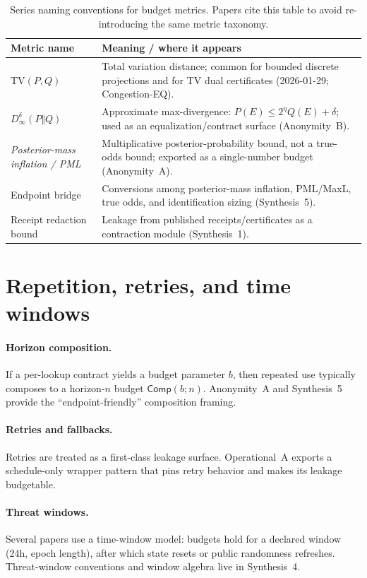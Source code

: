 \documentclass[11pt]{article}
\newcommand{\TV}{\mathrm{TV}}
\begin{document}
\begin{table}[t]
\centering
\begin{tabularx}{\linewidth}{@{}lX@{}}
\toprule
Metric name & Meaning / where it appears \\
\midrule
$\TV(P,Q)$ & Total variation distance; common for bounded discrete projections and for TV dual certificates (2026-01-29; Congestion-EQ).\\
$D_\infty^{\delta}(P\Vert Q)$ & Approximate max-divergence: $P(E)\le 2^{\eta}Q(E)+\delta$; used as an equalization/contract surface (Anonymity~B).\\
\emph{Posterior-mass inflation / PML} & Multiplicative posterior-probability bound, not a true-odds bound; exported as a single-number budget (Anonymity~A).\\
Endpoint bridge & Conversions among posterior-mass inflation, PML/MaxL, true odds, and identification sizing (Synthesis~5).\\
Receipt redaction bound & Leakage from published receipts/certificates as a contraction module (Synthesis~1).\\
\bottomrule
\end{tabularx}
\caption{Series naming conventions for budget metrics. Papers cite this table to avoid re-introducing the same metric taxonomy.}
\label{tab:metrics}
\end{table}

\section{Repetition, retries, and time windows}
\paragraph{Horizon composition.}
If a per-lookup contract yields a budget parameter $b$, then repeated use typically composes to a horizon-$n$ budget $\mathsf{Comp}(b;n)$.
Anonymity~A and Synthesis~5 provide the ``endpoint-friendly'' composition framing.

\paragraph{Retries and fallbacks.}
Retries are treated as a first-class leakage surface.
Operational~A exports a schedule-only wrapper pattern that pins retry behavior and makes its leakage budgetable.\cite{series:operationalA}

\paragraph{Threat windows.}
Several papers use a time-window model: budgets hold for a declared window (24h, epoch length), after which state resets or public randomness refreshes.
Threat-window conventions and window algebra live in Synthesis~4.\cite{series:threatwindows}
\end{document}
